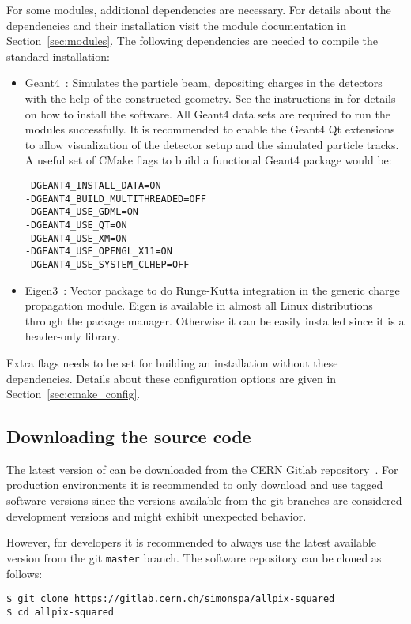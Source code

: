 For some modules, additional dependencies are necessary.
For details about the dependencies and their installation visit the module documentation in Section~\ref{sec:modules}.
The following dependencies are needed to compile the standard installation:
\begin{itemize}
\item Geant4~\cite{geant4}: Simulates the particle beam, depositing charges in the detectors with the help of the constructed geometry.
See the instructions in \cite{geant4installation} for details on how to install the software.
All Geant4 data sets are required to run the modules successfully.
It is recommended to enable the Geant4 Qt extensions to allow visualization of the detector setup and the simulated particle tracks.
A useful set of CMake flags to build a functional Geant4 package would be:
\begin{verbatim}
-DGEANT4_INSTALL_DATA=ON
-DGEANT4_BUILD_MULTITHREADED=OFF
-DGEANT4_USE_GDML=ON
-DGEANT4_USE_QT=ON
-DGEANT4_USE_XM=ON
-DGEANT4_USE_OPENGL_X11=ON
-DGEANT4_USE_SYSTEM_CLHEP=OFF
\end{verbatim}
\item Eigen3~\cite{eigen3}: Vector package to do Runge-Kutta integration in the generic charge propagation module.
Eigen is available in almost all Linux distributions through the package manager.
Otherwise it can be easily installed since it is a header-only library.
\end{itemize}
Extra flags needs to be set for building an \apsq installation without these dependencies.
Details about these configuration options are given in Section~\ref{sec:cmake_config}.

\subsection{Downloading the source code}
The latest version of \apsq can be downloaded from the CERN Gitlab repository~\cite{ap2-repo}.
For production environments it is recommended to only download and use tagged software versions since the versions available from the git branches are considered development versions and might exhibit unexpected behavior.

However, for developers it is recommended to always use the latest available version from the git \texttt{master} branch.
The software repository can be cloned as follows:

\begin{verbatim}
$ git clone https://gitlab.cern.ch/simonspa/allpix-squared
$ cd allpix-squared
\end{verbatim}

